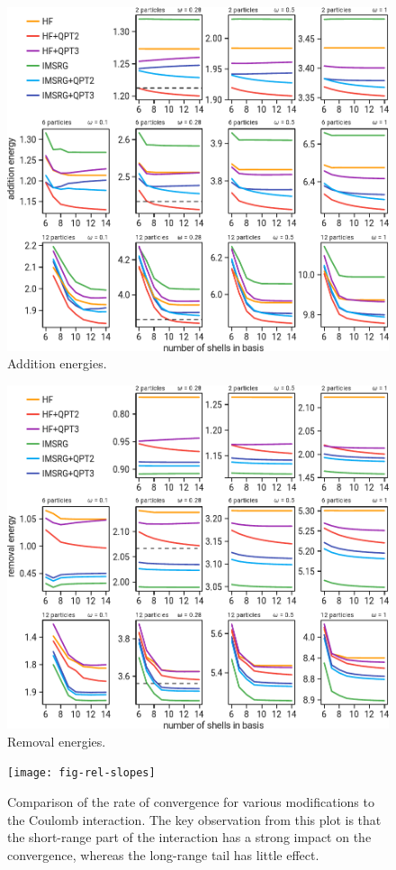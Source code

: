 \begin{figure}
  \centering
  \includegraphics[width=0.8\linewidth]{fig-add}
  \caption{Addition energies.}
  \label{fig:add}
\end{figure}

\begin{figure}
  \centering
  \includegraphics[width=0.8\linewidth]{fig-rm}
  \caption{Removal energies.}
  \label{fig:rm}
\end{figure}

\begin{figure}
  \centering
  \texttt{[image: fig-rel-slopes]}
  \caption{Comparison of the rate of convergence for various modifications to the Coulomb interaction.  The key observation from this plot is that the short-range part of the interaction has a strong impact on the convergence, whereas the long-range tail has little effect.}
  \label{fig:rel-slopes}
\end{figure}

